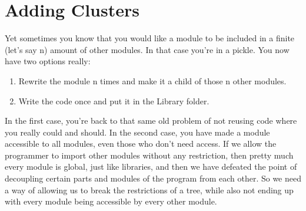 \documentclass{article}
\begin{document}

\section{Adding Clusters}

Yet sometimes you know that you would like a module to be included in a finite (let’s say n) amount of other modules. In that case you’re in a pickle. You now have two options really:

\begin{enumerate}
    \item Rewrite the module n times and make it a child of those n other modules.
    \item Write the code once and put it in the Library folder.
\end{enumerate}

In the first case, you’re back to that same old problem of not reusing code where you really could and should. In the second case, you have made a module accessible to all modules, even those who don’t need access. If we allow the programmer to import other modules without any restriction, then pretty much every module is global, just like libraries, and then we have defeated the point of decoupling certain parts and modules of the program from each other. So we need a way of allowing us to break the restrictions of a tree, while also not ending up with every module being accessible by every other module.
\end{document}
